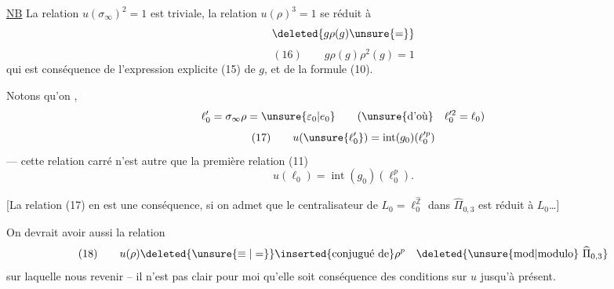 
\uline{NB} La relation  $u(\sigma_\infty)^2=1$ est triviale, la relation $u(\rho)^3=1$ se réduit à
\[
\deleted{g\rho(g)\unsure{=}}
\]
\[
(16)\qquad g\rho(g)\rho^2(g)=1
\]
qui est conséquence de l'expression explicite (15) de $g$, et de la formule (10).

Notons qu'on  ,  
\[
\ell'_0=\sigma_\infty\rho=\unsure{\varepsilon_0|e_0}\qquad
(\text{\unsure{d'où}}\quad \ell_0^{\prime 2}=\ell_0)
\]
\[
(17)\qquad
u(\unsure{\ell'_0})
=\operatorname{int}(g_0)(\ell_0^{\prime p})
\]
--- cette relation  carré n'est autre que la première relation (11)
\[
u(\ell_0)=\operatorname{int}(g_0)(\ell_0^p).
\]

[La relation (17) en est une conséquence, si on admet que le centralisateur de $L_0=\ell_0^{\widehat{\mathbb Z}}$ dans $\widehat{\Pi}_{0,3}$ est réduit à $L_0$\ldots]

On devrait avoir aussi la relation
\[
(18)\qquad u(\rho)\deleted{\unsure{\equiv|=}}\inserted{\text{conjugué de}}\rho^p
\quad\deleted{\text{\unsure{mod|modulo}}\ \widehat{\Pi}_{0,3}}
\]
 sur laquelle nous  revenir -- il n'est pas clair pour moi qu'elle soit conséquence des conditions  sur $u$ jusqu'à présent.
